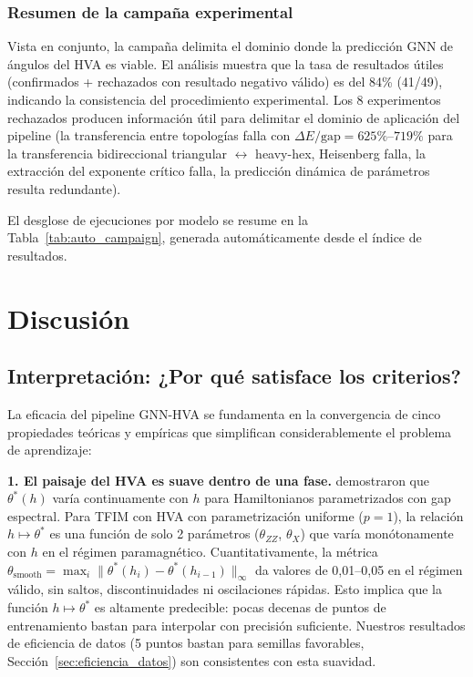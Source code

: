 \documentclass[11pt,a4paper,spanish]{book}
\begin{document}
\subsection{Resumen de la campaña experimental}
\label{sec:resumen_campana}

Vista en conjunto, la campaña delimita el dominio donde la predicción GNN de ángulos del HVA es viable. El análisis muestra que la tasa de resultados útiles (confirmados + rechazados con resultado negativo válido) es del 84\% (41/49), indicando la consistencia del procedimiento experimental. Los 8 experimentos rechazados producen información útil para delimitar el dominio de aplicación del pipeline (la transferencia entre topologías falla con $\Delta E/\text{gap} = 625\%$--$719\%$ para la transferencia bidireccional triangular $\leftrightarrow$ heavy-hex, Heisenberg falla, la extracción del exponente crítico falla, la predicción dinámica de parámetros resulta redundante).

El desglose de ejecuciones por modelo se resume en la Tabla~\ref{tab:auto_campaign}, generada automáticamente desde el índice de resultados.




\chapter{Discusión}

\section{Interpretación: ¿Por qué satisface los criterios?}
\label{sec:interpretacion}

La eficacia del pipeline GNN-HVA se fundamenta en la convergencia de cinco propiedades teóricas y empíricas que simplifican considerablemente el problema de aprendizaje:

\textbf{1. El paisaje del HVA es suave dentro de una fase.} \citet{mele2022} demostraron que $\theta^*(h)$ varía continuamente con $h$ para Hamiltonianos parametrizados con gap espectral. Para TFIM con HVA con parametrización uniforme ($p = 1$), la relación $h \mapsto \theta^*$ es una función de solo 2 parámetros ($\theta_{ZZ}$, $\theta_X$) que varía monótonamente con $h$ en el régimen paramagnético. Cuantitativamente, la métrica $\theta_{\text{smooth}} = \max_i \|\theta^*(h_i) - \theta^*(h_{i-1})\|_\infty$ da valores de 0,01--0,05 en el régimen válido, sin saltos, discontinuidades ni oscilaciones rápidas. Esto implica que la función $h \mapsto \theta^*$ es altamente predecible: pocas decenas de puntos de entrenamiento bastan para interpolar con precisión suficiente. Nuestros resultados de eficiencia de datos (5 puntos bastan para semillas favorables, Sección~\ref{sec:eficiencia_datos}) son consistentes con esta suavidad.
\end{document}
